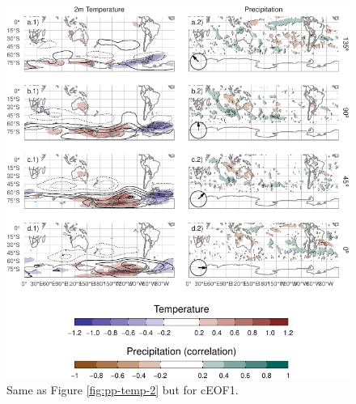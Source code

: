 \documentclass[pdflatex,lineno,sn-basic]{sn-jnl}
\theoremstyle{thmstyleone}%
\theoremstyle{thmstyletwo}%
\theoremstyle{thmstylethree}%
\begin{document}
\begin{figure}
\centering
\includegraphics{shceof_files/figure-latex/pp-temp-1-1.pdf}
\caption{\label{fig:pp-temp-1}Same as Figure \ref{fig:pp-temp-2} but for cEOF1.}
\end{figure}



\end{document}
